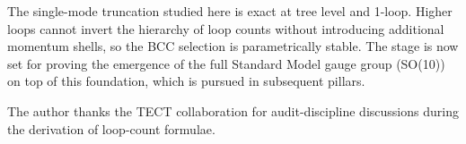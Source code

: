 The single-mode truncation studied here is exact at tree level and 1-loop. Higher loops
cannot invert the hierarchy of loop counts without introducing additional momentum shells,
so the BCC selection is parametrically stable. The stage is now set for proving the
emergence of the full Standard Model gauge group (SO(10)) on top of this foundation,
which is pursued in subsequent pillars.

\begin{acknowledgments}
The author thanks the TECT collaboration for audit-discipline
discussions during the derivation of loop-count formulae.
\end{acknowledgments}





